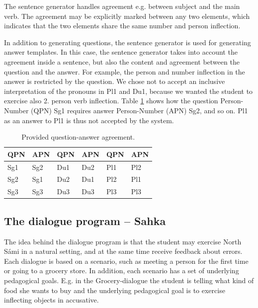 \documentclass[11pt]{article}
\begin{document}
The sentence generator handles agreement e.g. between subject and the main verb. The agreement may be explicitly marked between any two elements, which indicates that the two elements share the same number and person inflection.

In addition to generating questions, the sentence generator is used for generating answer templates. In this case, the sentence generator takes into account the agreement inside a sentence, but also the content and agreement between the question and the answer. For example, the person and number inflection in the answer is restricted by the question. We chose not to accept an inclusive interpretation of the pronouns in Pl1 and Du1, because we wanted the student to exercise also 2. person verb inflection. Table \ref{QA} shows how the question Person-Number (QPN) Sg1 requires answer Person-Number (APN) Sg2, and so on. Pl1 as an answer to Pl1 is thus not accepted by the system.\\


\begin{table}[htdp]
\caption{Provided question-answer agreement.}
\begin{center}
\begin{tabular}[t]{ll|ll|ll}
QPN &APN &QPN &APN &QPN &APN \\
\hline
Sg1 &Sg2 &Du1 &Du2 &Pl1 &Pl2 \\
Sg2 &Sg1 &Du2 &Du1 &Pl2 &Pl1 \\
Sg3 &Sg3 &Du3 &Du3 &Pl3 &Pl3 \\
\hline
\end{tabular}
\end{center}
\label{QA}
\end{table}





\subsection{The dialogue program -- Sahka}\label{sahka}
The idea behind the dialogue program is that the student may exercise North Sámi in a natural setting, and at the same time receive feedback about errors. Each dialogue is based on a scenario, such as meeting a person for the first time or going to a grocery store. In addition, each scenario has a set of underlying pedagogical goals. E.g. in the Grocery-dialogue the student is telling what kind of food she wants to buy and the underlying pedagogical goal is to exercise inflecting objects in accusative. 
\end{document}
